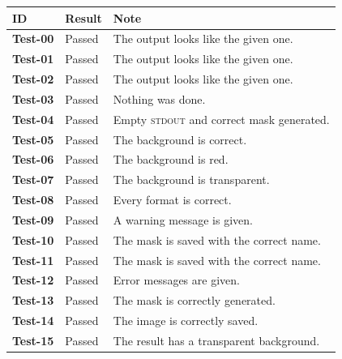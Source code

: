 \documentclass[a4paper]{article}
\begin{document}
\bgroup{}
\def\arraystretch{1.25}
\begin{center}
    \begin{tabular}{ |l|l|l| }
        \hline
        \textbf{ID} & \textbf{Result} & \textbf{Note} \\
        \hline
        \textbf{Test-00} & \color{darkgreen} Passed & The output looks like the given one. \\
        \hline
        \textbf{Test-01} & \color{darkgreen} Passed & The output looks like the given one. \\
        \hline
        \textbf{Test-02} & \color{darkgreen} Passed & The output looks like the given one. \\
        \hline
        \textbf{Test-03} & \color{darkgreen} Passed & Nothing was done. \\
        \hline
        \textbf{Test-04} & \color{darkgreen} Passed & Empty \textsc{stdout} and correct mask generated. \\
        \hline
        \textbf{Test-05} & \color{darkgreen} Passed & The background is correct. \\
        \hline
        \textbf{Test-06} & \color{darkgreen} Passed & The background is red. \\
        \hline
        \textbf{Test-07} & \color{darkgreen} Passed & The background is transparent. \\
        \hline
        \textbf{Test-08} & \color{darkgreen} Passed & Every format is correct. \\
        \hline
        \textbf{Test-09} & \color{darkgreen} Passed & A warning message is given. \\
        \hline
        \textbf{Test-10} & \color{darkgreen} Passed & The mask is saved with the correct name. \\
        \hline
        \textbf{Test-11} & \color{darkgreen} Passed & The mask is saved with the correct name. \\
        \hline
        \textbf{Test-12} & \color{darkgreen} Passed & Error messages are given. \\
        \hline
        \textbf{Test-13} & \color{darkgreen} Passed & The mask is correctly generated. \\
        \hline
        \textbf{Test-14} & \color{darkgreen} Passed & The image is correctly saved. \\
        \hline
        \textbf{Test-15} & \color{darkgreen} Passed & The result has a transparent background. \\

\end{tabular}
\end{center}
\end{document}
